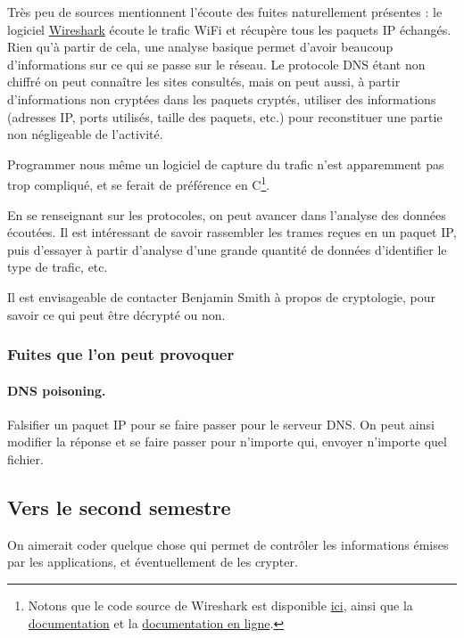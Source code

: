 \documentclass[a4paper, 11pt]{article}
\begin{document}
		Très peu de sources mentionnent l'écoute des fuites naturellement présentes : le logiciel \href{https://www.wireshark.org/}{Wireshark} écoute le trafic WiFi et récupère tous les paquets IP échangés. Rien qu'à partir de cela, une analyse basique permet d'avoir beaucoup d'informations sur ce qui se passe sur le réseau. Le protocole DNS étant non chiffré on peut connaître les sites consultés, mais on peut aussi, à partir d'informations non cryptées dans les paquets cryptés, utiliser des informations (adresses IP, ports utilisés, taille des paquets, etc.) pour reconstituer une partie non négligeable de l'activité.
		
		Programmer nous même un logiciel de capture du trafic n'est apparemment pas trop compliqué, et se ferait de préférence en C\footnote{Notons que le code source de Wireshark est disponible \href{https://1.eu.dl.wireshark.org/src/wireshark-1.12.7.tar.bz2}{ici}, ainsi que la \href{https://www.wireshark.org/download/docs/user-guide-a4.pdf}{documentation} et la \href{https://www.wireshark.org/docs/wsug_html_chunked}{documentation en ligne}.}.
		
		En se renseignant sur les protocoles, on peut avancer dans l'analyse des données écoutées. Il est intéressant de savoir rassembler les trames reçues en un paquet IP, puis d'essayer à partir d'analyse d'une grande quantité de données d'identifier le type de trafic, etc.
		
		Il est envisageable de contacter Benjamin Smith à propos de cryptologie, pour savoir ce qui peut être décrypté ou non.
		
		\subsubsection{Fuites que l'on peut provoquer}
		
		\paragraph{DNS poisoning.} Falsifier un paquet IP pour se faire passer pour le serveur DNS. On peut ainsi modifier la réponse et se faire passer pour n'importe qui, envoyer n'importe quel fichier.
		
	\subsection{Vers le second semestre}
	
	On aimerait coder quelque chose qui permet de contrôler les informations émises par les applications, et éventuellement de les crypter.
	
\end{document}
